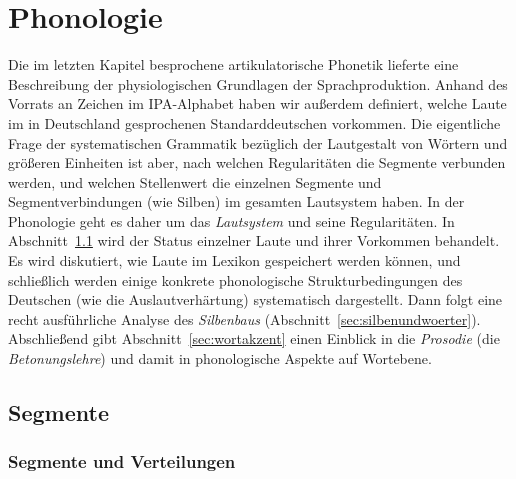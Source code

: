 \chapter{Phonologie}

\label{sec:phonologie}

Die im letzten Kapitel besprochene artikulatorische Phonetik lieferte eine Beschreibung der physiologischen Grundlagen der Sprachproduktion.
Anhand des Vorrats an Zeichen im IPA-Alphabet haben wir außerdem definiert, welche Laute im in Deutschland gesprochenen Standarddeutschen vorkommen.
Die eigentliche Frage der systematischen Grammatik bezüglich der Lautgestalt von Wörtern und größeren Einheiten ist aber, nach welchen Regularitäten die Segmente verbunden werden, und welchen Stellenwert die einzelnen Segmente und Segmentverbindungen (wie \zB Silben) im gesamten Lautsystem haben.
In der Phonologie geht es daher um das \textit{Lautsystem} und seine Regularitäten.
In Abschnitt~\ref{sec:segmente} wird der Status einzelner Laute und ihrer Vorkommen behandelt.
Es wird diskutiert, wie Laute im Lexikon gespeichert werden können, und schließlich werden einige konkrete phonologische Strukturbedingungen des Deutschen (wie die Auslautverhärtung) systematisch dargestellt.
Dann folgt eine recht ausführliche Analyse des \textit{Silbenbaus} (Abschnitt~\ref{sec:silbenundwoerter}).
Abschließend gibt Abschnitt~\ref{sec:wortakzent} einen Einblick in die \textit{Prosodie} (die \textit{Betonungslehre}) und damit in phonologische Aspekte auf Wortebene.

\section{Segmente}

\label{sec:segmente}

\subsection{Segmente und Verteilungen}

\label{sec:segmentemerkmaleverteilungen}

